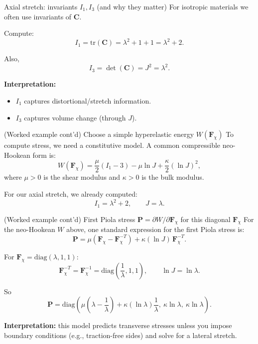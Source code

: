 \documentclass[aspectratio=169]{beamer}
\newcommand{\Cten}{\bm{C}}     %
\newcommand{\Fdef}{\bm{F}_{\chi}}  %
\newcommand{\Pten}{\bm{P}}         %
\begin{document}
\begin{frame}{Axial stretch: invariants \(I_1,I_3\) (and why they matter)}
\small
For isotropic materials we often use invariants of \(\Cten\).

\medskip
Compute:
\[
I_1=\mathrm{tr}(\Cten)=\lambda^2+1+1=\lambda^2+2.
\]

Also,
\[
I_3=\det(\Cten)=J^2=\lambda^2.
\]

\medskip
\textbf{Interpretation:}
\begin{itemize}
\item \(I_1\) captures distortional/stretch information.
\item \(I_3\) captures volume change (through \(J\)).
\end{itemize}

\end{frame}

\begin{frame}{(Worked example cont'd) Choose a simple hyperelastic energy \(W(\Fdef)\)}
\small
To compute stress, we need a constitutive model. A common compressible neo-Hookean form is:
\[
W(\Fdef)=\frac{\mu}{2}(I_1-3)-\mu\ln J+\frac{\kappa}{2}(\ln J)^2,
\]
where \(\mu>0\) is the shear modulus and \(\kappa>0\) is the bulk modulus.

\medskip
For our axial stretch, we already computed:
\[
I_1=\lambda^2+2,\qquad J=\lambda.
\]


\end{frame}

\begin{frame}{(Worked example cont'd) First Piola stress \(\Pten = \partial W/\partial \Fdef\) for this diagonal \(\Fdef\)}
\small
For the neo-Hookean \(W\) above, one standard expression for the first Piola stress is:
\[
\Pten = \mu\left(\Fdef-\Fdef^{-T}\right)+\kappa(\ln J)\,\Fdef^{-T}.
\]

\medskip
For \(\Fdef=\mathrm{diag}(\lambda,1,1)\):
\[
\Fdef^{-T}=\Fdef^{-1}=\mathrm{diag}\left(\frac{1}{\lambda},1,1\right),
\qquad \ln J=\ln \lambda.
\]

So
\[
\Pten
=
\mathrm{diag}\left(
\mu\left(\lambda-\frac{1}{\lambda}\right)+\kappa(\ln\lambda)\frac{1}{\lambda},
\ \kappa\ln\lambda,
\ \kappa\ln\lambda
\right).
\]

\medskip
\textbf{Interpretation:} this model predicts transverse stresses unless you impose boundary conditions (e.g., traction-free sides) and solve for a lateral stretch.


\end{frame}
\end{document}
